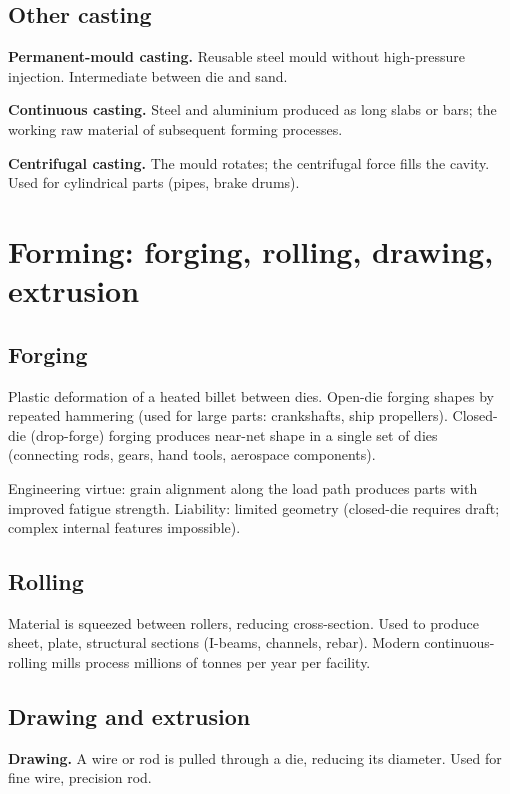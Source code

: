 \subsection{Other casting}

\textbf{Permanent-mould casting.} Reusable steel mould without high-pressure injection. Intermediate between die and sand.

\textbf{Continuous casting.} Steel and aluminium produced as long slabs or bars; the working raw material of subsequent forming processes.

\textbf{Centrifugal casting.} The mould rotates; the centrifugal force fills the cavity. Used for cylindrical parts (pipes, brake drums).

\section{Forming: forging, rolling, drawing, extrusion}

\subsection{Forging}

Plastic deformation of a heated billet between dies. Open-die forging shapes by repeated hammering (used for large parts: crankshafts, ship propellers). Closed-die (drop-forge) forging produces near-net shape in a single set of dies (connecting rods, gears, hand tools, aerospace components).

Engineering virtue: grain alignment along the load path produces parts with improved fatigue strength. Liability: limited geometry (closed-die requires draft; complex internal features impossible).

\subsection{Rolling}

Material is squeezed between rollers, reducing cross-section. Used to produce sheet, plate, structural sections (I-beams, channels, rebar). Modern continuous-rolling mills process millions of tonnes per year per facility.

\subsection{Drawing and extrusion}

\textbf{Drawing.} A wire or rod is pulled through a die, reducing its diameter. Used for fine wire, precision rod.

